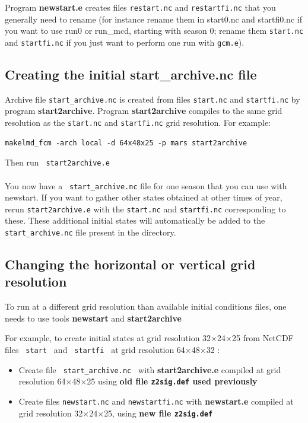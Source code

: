  

Program {\bf newstart.e} creates files 
{\tt restart.nc} and {\tt restartfi.nc}
that you generally need to rename (for instance rename them in start0.nc
and startfi0.nc if you want to use run0 or run\_mcd, starting with season 0;
rename them {\tt start.nc} and {\tt startfi.nc} if you just want to perform
one run with {\tt gcm.e}). 


\subsection{Creating the initial start\_archive.nc file } 

Archive file
{\tt start\_archive.nc} is created from files
{\tt start.nc} and {\tt startfi.nc} by program {\bf start2archive}.
Program {\bf start2archive} compiles to the same grid resolution as the
{\tt start.nc} and {\tt startfi.nc} grid resolution. For example:

\begin{verbatim}
makelmd_fcm -arch local -d 64x48x25 -p mars start2archive
\end{verbatim}
Then run \verb+ start2archive.e+ \\ \\
You now have a \verb+ start_archive.nc+ file for one season that you can
use with newstart.
If you want to gather other states obtained at other times of year, rerun
{\tt start2archive.e} with the {\tt start.nc} and {\tt startfi.nc}
 corresponding to these.
These additional initial states will automatically be added to the
{\tt start\_archive.nc} file present in the directory.  

\subsection{Changing the horizontal or vertical grid resolution}

To run at a different grid resolution than available initial conditions
files, one needs to use tools {\bf newstart} and {\bf start2archive}

For example, to create initial states at grid resolution
32$\times$24$\times$25 from NetCDF files
\verb+ start + and \verb+ startfi + at grid resolution
  64$\times$48$\times$32 :

\begin{itemize}
\item Create file \verb+ start_archive.nc + 
with {\bf start2archive.e} compiled at grid resolution
64$\times$48$\times$25 using {\bf old file {\tt z2sig.def}
 used previously}

\item Create files 
{\tt newstart.nc} and {\tt newstartfi.nc}
 with {\bf newstart.e}
compiled at grid resolution 32$\times$24$\times$25,
using {\bf new file {\tt z2sig.def}}

\end{itemize} 

